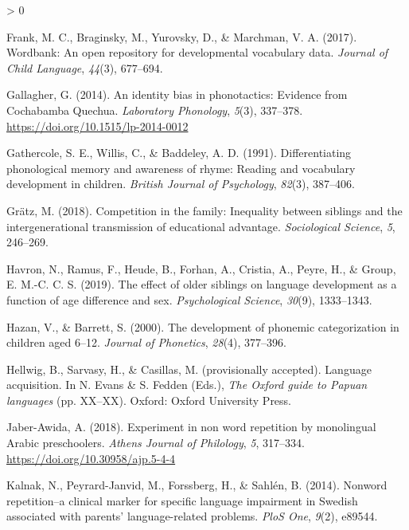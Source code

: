 \documentclass[
  american,
  ,man,floatsintext]{apa6}
\newlength{\cslhangindent}
\newenvironment{CSLReferences}[2] %
 {%
  \setlength{\parindent}{0pt}
  \ifodd #1 \everypar{\setlength{\hangindent}{\cslhangindent}}\ignorespaces\fi
  \ifnum #2 > 0
  \setlength{\parskip}{#2\baselineskip}
  \fi
 }%
 {}
\begin{document}
\begin{CSLReferences}{1}{0}
\leavevmode\hypertarget{ref-frank2017wordbank}{}%
Frank, M. C., Braginsky, M., Yurovsky, D., \& Marchman, V. A. (2017). Wordbank: An open repository for developmental vocabulary data. \emph{Journal of Child Language}, \emph{44}(3), 677--694.

\leavevmode\hypertarget{ref-gallagher2014identity}{}%
Gallagher, G. (2014). {An identity bias in phonotactics: Evidence from Cochabamba Quechua}. \emph{Laboratory Phonology}, \emph{5}(3), 337--378. \url{https://doi.org/10.1515/lp-2014-0012}

\leavevmode\hypertarget{ref-gathercole1991differentiating}{}%
Gathercole, S. E., Willis, C., \& Baddeley, A. D. (1991). Differentiating phonological memory and awareness of rhyme: Reading and vocabulary development in children. \emph{British Journal of Psychology}, \emph{82}(3), 387--406.

\leavevmode\hypertarget{ref-gratz2018competition}{}%
Grätz, M. (2018). Competition in the family: Inequality between siblings and the intergenerational transmission of educational advantage. \emph{Sociological Science}, \emph{5}, 246--269.

\leavevmode\hypertarget{ref-havron2019effect}{}%
Havron, N., Ramus, F., Heude, B., Forhan, A., Cristia, A., Peyre, H., \& Group, E. M.-C. C. S. (2019). The effect of older siblings on language development as a function of age difference and sex. \emph{Psychological Science}, \emph{30}(9), 1333--1343.

\leavevmode\hypertarget{ref-hazan2000development}{}%
Hazan, V., \& Barrett, S. (2000). The development of phonemic categorization in children aged 6--12. \emph{Journal of Phonetics}, \emph{28}(4), 377--396.

\leavevmode\hypertarget{ref-hellwigPAlanguage}{}%
Hellwig, B., Sarvasy, H., \& Casillas, M. (provisionally accepted). Language acquisition. In N. Evans \& S. Fedden (Eds.), \emph{The {O}xford guide to {P}apuan languages} (pp. XX--XX). Oxford: Oxford University Press.

\leavevmode\hypertarget{ref-jabere2018xperiment}{}%
Jaber-Awida, A. (2018). Experiment in non word repetition by monolingual {A}rabic preschoolers. \emph{Athens Journal of Philology}, \emph{5}, 317--334. \url{https://doi.org/10.30958/ajp.5-4-4}

\leavevmode\hypertarget{ref-kalnak2014nonword}{}%
Kalnak, N., Peyrard-Janvid, M., Forssberg, H., \& Sahlén, B. (2014). Nonword repetition--a clinical marker for specific language impairment in {S}wedish associated with parents' language-related problems. \emph{PloS One}, \emph{9}(2), e89544.


\end{CSLReferences}
\end{document}
